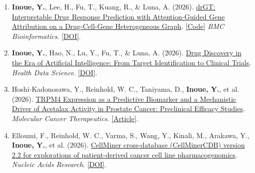 \documentclass[11pt]{article}
\begin{document}
\begin{enumerate}[label={J\arabic*.}]
    \entryspace\item \textbf{Inoue, Y.}, Lee, H., Fu, T., Kuang, R., \& Luna, A. (2026).
    \href{https://link.springer.com/article/10.1186/s12859-026-06417-z}{drGT: Interpretable Drug Response Prediction with Attention-Guided Gene Attribution on a Drug-Cell-Gene Heterogeneous Graph}. \href{https://github.com/inoue0426/drGT}{[Code]}
    \textit{BMC Bioinformatics}. \href{https://doi.org/10.1186/s12859-026-06417-z}{[DOI]}.

    \entryspace\item \textbf{Inoue, Y.}, Hao, N., Lu, Y., Fu, T., \& Luna, A. (2026).
    \href{https://spj.science.org/doi/10.34133/hds.0434}{Drug Discovery in the Era of Artificial Intelligence: From Target Identification to Clinical Trials}.
    \textit{Health Data Science}. \href{https://doi.org/10.34133/hds.0434}{[DOI]}.

    \entryspace\item Hoshi-Kadonosawa, Y., Reinhold, W. C., Taniyama, D., \textbf{Inoue, Y.}, et al. (2026).
    \href{https://pmc.ncbi.nlm.nih.gov/articles/PMC13290428/}{TRPM4 Expression as a Predictive Biomarker and a Mechanistic Driver of Acetalax Activity in Prostate Cancer: Preclinical Efficacy Studies}.
    \textit{Molecular Cancer Therapeutics}. \href{https://pmc.ncbi.nlm.nih.gov/articles/PMC13290428/}{[Article]}.

    \entryspace\item Elloumi, F., Reinhold, W. C., Varma, S., Wang, Y., Kinali, M., Arakawa, Y., \textbf{Inoue, Y.}, et al. (2026).
    \href{https://doi.org/10.1093/nar/gkaf1230}{CellMiner cross-database (CellMinerCDB) version 2.2 for explorations of patient-derived cancer cell line pharmacogenomics}.
    \textit{Nucleic Acids Research}. \href{https://doi.org/10.1093/nar/gkaf1230}{[DOI]}.
\end{enumerate}
\end{document}
